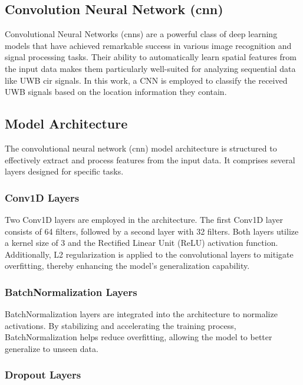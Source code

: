\subsection{Convolution Neural Network (\gls{cnn})}\label{cnn}

Convolutional Neural Networks (\gls{cnn}s) are a powerful class of deep learning models that have achieved remarkable success in various image recognition and signal processing tasks. Their ability to automatically learn spatial features from the input data makes them particularly well-suited for analyzing sequential data like UWB \gls{cir} signals. In this work, a CNN is employed to classify the received UWB signals based on the location information they contain.


\subsection{Model Architecture}

The convolutional neural network (\gls{cnn}) model architecture is structured to effectively extract and process features from the input data. It comprises several layers designed for specific tasks.

\subsubsection{Conv1D Layers}

Two Conv1D layers are employed in the architecture. The first Conv1D layer consists of 64 filters, followed by a second layer with 32 filters. Both layers utilize a kernel size of 3 and the Rectified Linear Unit (ReLU) activation function. Additionally, L2 regularization is applied to the convolutional layers to mitigate overfitting, thereby enhancing the model's generalization capability.

\subsubsection{BatchNormalization Layers}

BatchNormalization layers are integrated into the architecture to normalize activations. By stabilizing and accelerating the training process, BatchNormalization helps reduce overfitting, allowing the model to better generalize to unseen data.

\subsubsection{Dropout Layers}


